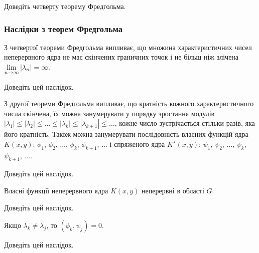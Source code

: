 \begin{exercise}
	Доведіть четверту теорему Фредгольма.
\end{exercise}

\subsubsection{Наслідки з теорем Фредгольма}

\begin{corollary}
	З четвертої теореми Фредгольма випливає, що множина характеристичних чисел неперервного ядра не має скінчених граничних точок і не більш ніж злічена $\displaystyle\lim\limits_{n \to \infty} |\lambda_n| = \infty$.
\end{corollary}

\begin{exercise}
	Доведіть цей наслідок.
\end{exercise}

\begin{corollary}
	З другої теореми Фредгольма випливає, що кратність кожного характеристичного числа скінчена, їх можна занумерувати у порядку зростання модулів $|\lambda_1| \le |\lambda_2| \le \ldots \le |\lambda_k| \le |\lambda_{k + 1}| \le \ldots$, кожне число зустрічається стільки разів, яка його кратність. Також можна занумерувати послідовність власних функцій ядра $K(x, y)$: $\phi_1$, $\phi_2$, $\ldots$, $\phi_k$, $\phi_{k + 1}$, $\ldots$ і спряженого ядра $K^\star (x, y)$: $\psi_1$, $\psi_2$, $\ldots$, $\psi_k$, $\psi_{k + 1}$, $\ldots$.
\end{corollary}

\begin{exercise}
	Доведіть цей наслідок.
\end{exercise}

\begin{corollary}
	Власні функції неперервного ядра $K(x, y)$ неперервні в області $G$.
\end{corollary}

\begin{exercise}
	Доведіть цей наслідок.
\end{exercise}

\begin{corollary}
	Якщо $\lambda_k \ne \lambda_j$, то $(\phi_k, \psi_j) = 0$.
\end{corollary}

\begin{exercise}
	Доведіть цей наслідок.
\end{exercise}

